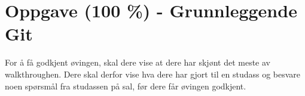 





\section{Oppgave (100 \%) - Grunnleggende Git}\label{sec:2-oppgave}

For å få godkjent øvingen, skal dere vise at dere har skjønt det meste av walkthroughen. Dere skal derfor vise hva dere har gjort til en studass og besvare noen spørsmål fra studassen på sal, før dere får øvingen godkjent.









